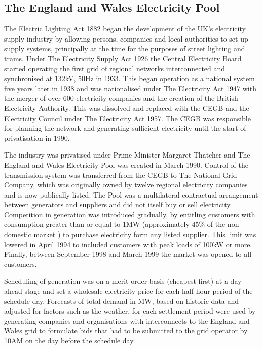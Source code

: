 \subsection{The England and Wales Electricity Pool}
\label{sec:thepool}
The Electric Lighting Act 1882 began the development of the UK's electricity
supply industry by allowing persons, companies and local authorities to set up
supply systems, principally at the time for the purposes of street lighting and
trams.  Under The Electricity Supply Act 1926 the Central Electricity Board
started operating the first grid of regional networks interconnected and
synchronised at 132kV, 50Hz in 1933.  This began operation as a national system
five years later in 1938 and was nationalised under The Electricity Act 1947
with the merger of over 600 electricity companies and the creation of the
British Electricity Authority.  This was dissolved and replaced with the
CEGB and the Electricity Council under The Electricity Act 1957.  The CEGB was
responsible for planning the network and generating sufficient electricity until the start of privatisation in 1990.

The industry was privatised under Prime Minister
Margaret Thatcher and The England and Wales Electricity Pool was created in
March 1990.  Control of the transmission system was transferred from the
CEGB to The National Grid Company, which was originally owned by twelve
regional electricity companies and is now publically listed.  The Pool was a
multilateral contractual arrangement between generators and suppliers and did
not itself buy or sell electricity.  Competition in generation was introduced
gradually, by entitling customers with consumption greater than or equal
to 1MW (approximately 45\% of the non-domestic market \cite{decc:dukes09}) to
purchase electricity form any listed supplier.  This limit was lowered in April
1994 to included customers with peak loads of 100kW or more.  Finally, between
September 1998 and March 1999 the market was opened to all customers.

Scheduling of generation was on a merit order basis (cheapest first) at a day
ahead stage and set a wholesale electricity price for each half-hour period of
the schedule day.  Forecasts of total demand in MW, based on historic data and
adjusted for factors such as the weather, for each settlement period were used
by generating companies and organisations with interconnects to the England
and Wales grid to formulate bids that had to be submitted to the grid operator
by 10AM on the day before the schedule day.

